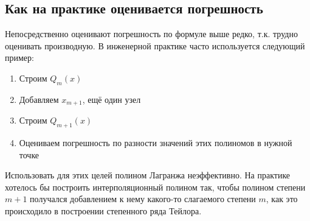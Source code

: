 \documentclass[a4paper,11pt]{article}
\begin{document}
  \subsection{Как на практике оценивается погрешность}
  Непосредственно оценивают погрешность по формуле выше редко, т.к. трудно оценивать производную. В инженерной практике часто используется следующий пример:
  \begin{enumerate}
    \item Строим $Q_m(x)$
    \item Добавляем $x_{m+1}$, ещё один узел
    \item Строим $Q_{m+1}(x)$
    \item Оцениваем погрешность по разности значений этих полиномов в нужной точке
  \end{enumerate}
  Использовать для этих целей полином Лагранжа неэффективно. На практике хотелось бы построить интерполяционный полином так, чтобы полином степени $m+1$ получался
    добавлением к нему какого-то слагаемого степени $m$, как это происходило в построении степенного ряда Тейлора.

\newpage
\end{document}
